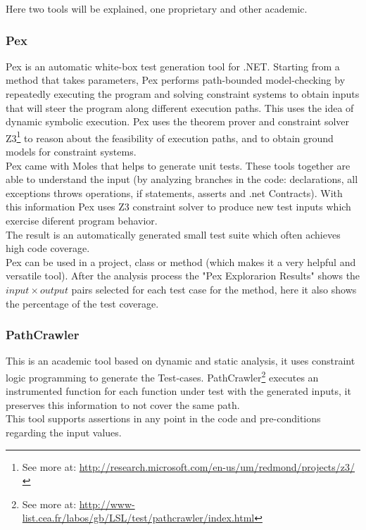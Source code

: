 Here two tools will be explained, one proprietary and other academic.

\subsubsection{Pex} Pex\cite{Tillmann:2008:PWB:1792786.1792798} is an automatic white-box test generation tool for .NET. Starting from a
method that takes parameters, Pex performs path-bounded model-checking
by repeatedly executing the program and solving constraint systems to obtain inputs that will steer the program along different execution paths.
This uses the idea of dynamic symbolic execution\cite{Tillmann06unittests}. Pex uses the theorem prover and
constraint solver Z3\footnote{See more at: \url{http://research.microsoft.com/en-us/um/redmond/projects/z3/}} to reason about the feasibility of execution paths, and
to obtain ground models for constraint systems.\\
Pex came with Moles that helps to generate unit tests. These tools together are able to understand the input (by analyzing branches in the code:
declarations, all exceptions throws operations, if statements, asserts and .net Contracts). With this information Pex uses Z3 constraint solver to
produce new test inputs which exercise diferent program behavior.\\
The result is an automatically generated small test suite which often achieves high code coverage.\\
Pex can be used in a project, class or method (which makes it a very helpful and versatile tool). After the analysis process the "Pex Explorarion Results" shows
the $input \times output$ pairs selected for each test case for the method, here it also shows the percentage of the test coverage.

\subsubsection{PathCrawler} This is an academic tool based on dynamic and static analysis\cite{Williams05pathcrawler:automatic}, 
it uses constraint logic programming to generate the Test-cases. PathCrawler\footnote{See more at: \url{http://www-list.cea.fr/labos/gb/LSL/test/pathcrawler/index.html}} executes an instrumented function for each function under test
with the generated inputs, it preserves this information to not cover the same path.\\
This tool supports assertions in any point in the code and pre-conditions regarding the input values.

